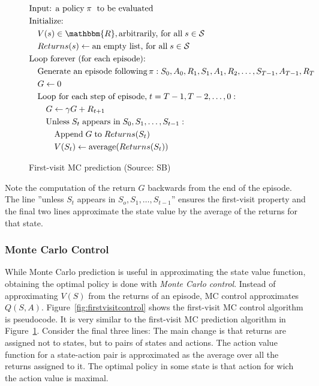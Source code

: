 \begin{figure}
\begin{tcolorbox}[colback=code]
\small
\vspace{-\baselineskip}
\begin{align*}
& \text{Input: a policy}\;\pi\;\text{ to be evaluated} \\
& \text{Initialize:} \\
& \quad V(s) \in \mathbbm{R}, \text{arbitrarily, for all}\;s \in \mathcal{S} \\
& \quad Returns(s) \leftarrow \text{an empty list, for all}\; s \in \mathcal{S} \\
& \text{Loop forever (for each episode):}\\
& \quad \text{Generate an episode following}\, \pi: S_0, A_0, R_1, S_1, A_1, R_2, \ldots, S_{T-1}, A_{T-1}, R_{T} \\
& \quad G \leftarrow 0 \\
& \quad \text{Loop for each step of episode,}\; t = T-1, T-2, \ldots, 0: \\
& \quad \quad G \leftarrow \gamma G + R_{t+1} \\
& \quad \quad \text{Unless}\; S_t\; \text{appears in}\; S_0, S_1, \ldots, S_{t-1}: \\
& \quad \quad \quad \text{Append}\; G\; \text{to}\; Returns(S_t) \\
& \quad \quad \quad V(S_t) \leftarrow \operatorname{average}(Returns(S_t))
\end{align*}
\end{tcolorbox}
\caption[First-visit MC prediction]{First-visit MC prediction (Source: SB)}
\label{fig:firstvisitmc}
\end{figure}

Note the computation of the return $G$ backwards from the end of the episode. The line ''unless $S_t$ appears in $S_o, S_1, \ldots, S_{t-1}$'' ensures the first-visit property and the final two lines approximate the state value by the average of the returns for that state.

\subsubsection*{Monte Carlo Control}

While Monte Carlo prediction is useful in approximating the state value function, obtaining the optimal policy is done with \emph{Monte Carlo control}. Instead of approximating $V(S)$ from the returns of an episode, MC control approximates $Q(S, A)$. Figure~\ref{fig:firstvisitcontrol} shows the first-visit MC control algorithm is pseudocode. It is very similar to the first-visit MC prediction algorithm in Figure~\ref{fig:firstvisitmc}. Consider the final three lines: The main change is that returns are assigned not to states, but to pairs of states and actions. The action value function for a state-action pair is approximated as the average over all the returns assigned to it. The optimal policy in some state is that action for wich the action value is maximal. 

